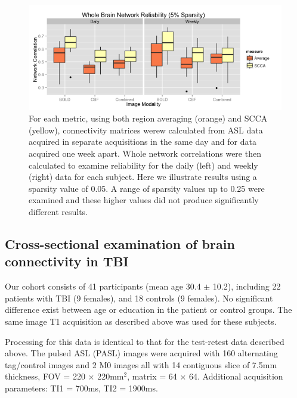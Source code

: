 \documentclass{llncs}
\begin{document}
\begin{figure}[tb]
\begin{center}
\includegraphics[width=0.8\linewidth]{retest.png} 
\caption{For each metric, using both region averaging (orange) and SCCA (yellow), connectivity matrices werew calculated from ASL data acquired in separate acquisitions in the same day and for data acquired one week apart. Whole network correlations were then calculated to examine reliability for the daily (left) and weekly (right) data for each subject. Here we illustrate results using a sparsity value of 0.05. A range of sparsity values up to 0.25 were examined and these higher values did not produce significantly different results.}
\label{fig:testretest}
\end{center}
\end{figure}

\subsection{Cross-sectional examination of brain connectivity in TBI}
 Our cohort consists of 41 participants (mean age 30.4 $\pm$ 10.2), including 22 patients with TBI (9 females), and 18 controls (9 females). No significant difference exist between age or education in the patient or control groups.  The same image T1 acquisition as described above was used for these subjects.

 Processing for this data is identical to that for the test-retest data described above. The pulsed ASL (PASL) images were acquired with 160 alternating tag/control images and 2 M0 images all with 14 contiguous slice of 7.5mm thickness, FOV = 220 $\times$ 220mm$^2$, matrix = 64 $\times$ 64. Additional acquisition parameters: TI1 = 700ms, TI2 = 1900ms.
\end{document}
